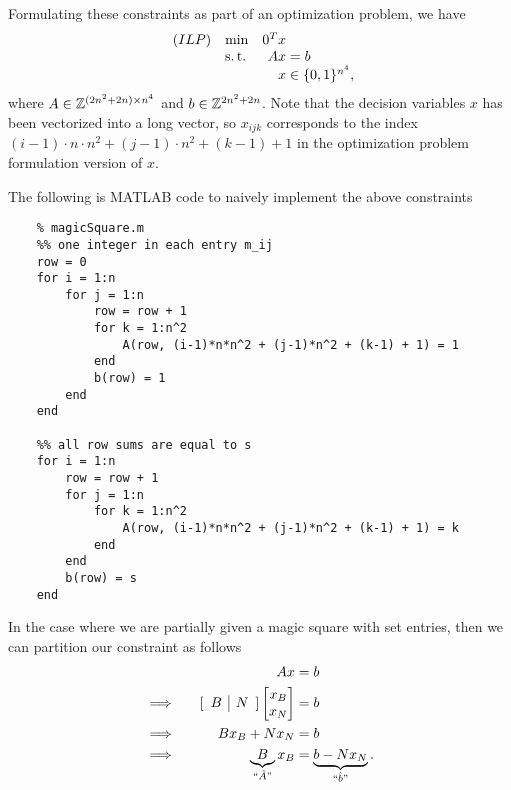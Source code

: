 \noindent Formulating these constraints as part of an optimization problem, we have 
    \begin{equation*}
        \begin{array}{llr@{}l@{}}
            (ILP)   & \min  & 0^T x &                   \\
                    & \st   & Ax    & {}= b             \\
                    &       &  x    & {}\in \{0, 1\}^{n^4},
        \end{array}
    \end{equation*}
where $A \in \mathbb Z^{(2n^2+2n) \times n^4}$ and $b \in \mathbb Z^{2n^2+2n}$. Note that the decision variables $x$ has been vectorized into a long vector, so $x_{ijk}$ corresponds to the index $(i-1) \cdot n \cdot n^2 + (j-1)\cdot n^2 + (k-1) + 1$ in the optimization problem formulation version of $x$.

The following is MATLAB code to naively implement the above constraints
\begin{lstlisting}
    % magicSquare.m
    %% one integer in each entry m_ij
    row = 0
    for i = 1:n
        for j = 1:n
            row = row + 1
            for k = 1:n^2
                A(row, (i-1)*n*n^2 + (j-1)*n^2 + (k-1) + 1) = 1
            end
            b(row) = 1
        end
    end
    
    %% all row sums are equal to s
    for i = 1:n
        row = row + 1
        for j = 1:n
            for k = 1:n^2
                A(row, (i-1)*n*n^2 + (j-1)*n^2 + (k-1) + 1) = k
            end
        end
        b(row) = s
    end
\end{lstlisting}

In the case where we are partially given a magic square with set entries, then we can partition our constraint as follows
\begin{alignat*}{2}
    &&Ax &= b \\
    &\Longrightarrow \quad & [\begin{array}{c|c} B & N\end{array}] \begin{bmatrix}
    x_B \\ x_N \end{bmatrix} &= b \\
    &\Longrightarrow \quad & Bx_B + Nx_N &= b \\
    &\Longrightarrow \quad & \underbrace{B}_{``\hat{A}"}x_B &= \underbrace{b-Nx_N}_{``\hat{b}"}.
\end{alignat*}

